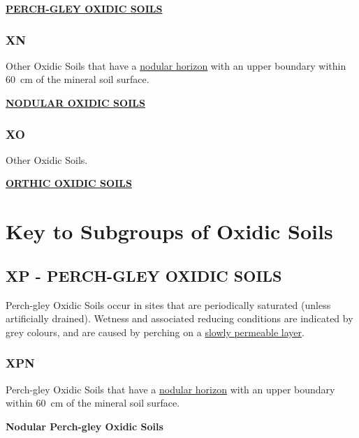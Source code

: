 \documentclass[
  letterpaper,
  DIV=11,
  numbers=noendperiod]{scrreprt}
\begin{document}
\protect\hyperlink{sec-XP}{\textbf{PERCH-GLEY OXIDIC SOILS}}

\hypertarget{sec-key-XN}{%
\subsubsection{\texorpdfstring{\textbf{XN}}{XN}}\label{sec-key-XN}}

Other Oxidic Soils that have a \protect\hyperlink{sec-diag-nodh}{nodular
horizon} with an upper boundary within 60~cm of the mineral soil
surface.

\protect\hyperlink{sec-XN}{\textbf{NODULAR OXIDIC SOILS}}

\hypertarget{sec-key-XO}{%
\subsubsection{\texorpdfstring{\textbf{XO}}{XO}}\label{sec-key-XO}}

Other Oxidic Soils.

\protect\hyperlink{sec-XO}{\textbf{ORTHIC OXIDIC SOILS}}

\hypertarget{sec-sub-X}{%
\section{Key to Subgroups of Oxidic Soils}\label{sec-sub-X}}

\hypertarget{sec-XP}{%
\subsection{\texorpdfstring{\textbf{XP} - PERCH-GLEY OXIDIC
SOILS}{XP - PERCH-GLEY OXIDIC SOILS}}\label{sec-XP}}

Perch-gley Oxidic Soils occur in sites that are periodically saturated
(unless artificially drained). Wetness and associated reducing
conditions are indicated by grey colours, and are caused by perching on
a \protect\hyperlink{sec-diag-slowp}{slowly permeable layer}.

\hypertarget{sec-key-XPN}{%
\subsubsection{\texorpdfstring{\textbf{XPN}}{XPN}}\label{sec-key-XPN}}

Perch-gley Oxidic Soils that have a
\protect\hyperlink{sec-diag-nodh}{nodular horizon} with an upper
boundary within 60~cm of the mineral soil surface.

\textbf{Nodular Perch-gley Oxidic Soils}
\end{document}
